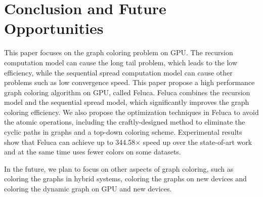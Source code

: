 \section{Conclusion and Future Opportunities}
\label{conclusion}

This paper focuses on the graph coloring problem on GPU. 
The recursion computation model can cause the long tail 
problem, which leads to the low efficiency, while the 
sequential spread computation model can cause other problems 
such as low convergence speed. This paper propose a high performance 
graph coloring algorithm on GPU, called Feluca. Feluca 
combines the recursion model and the sequential spread model, which significantly improves 
the graph coloring efficiency. We also propose the optimization techniques in Feluca to avoid the atomic operations, including the craftly-designed method to eliminate the cyclic paths in graphs and a top-down coloring 
scheme. Experimental results show that Feluca can achieve up to 
344.58$\times$ speed up over the state-of-art work and at the same time uses fewer colors on some datasets.

In the future, we plan to focus on other aspects of graph 
coloring, such as coloring the graphs in hybrid systems, coloring the 
graphs on new devices and coloring the dynamic graph on GPU and new devices.